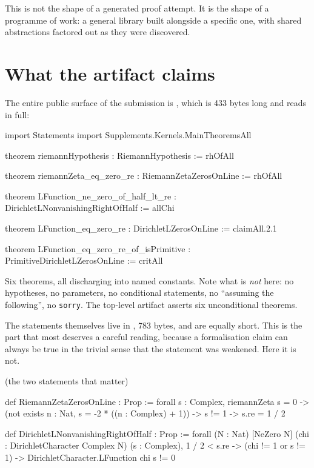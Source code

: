This is not the shape of a generated proof attempt. It is the shape of a
programme of work: a general library built alongside a specific one, with
shared abstractions factored out as they were discovered.

\section{What the artifact claims}The entire public surface of the submission is , which
is 433 bytes long and reads in full:

\begin{seamnote}{}
\begin{leanquote}
import Statements
import Supplements.Kernels.MainTheoremsAll

theorem riemannHypothesis : RiemannHypothesis := rhOfAll

theorem riemannZeta_eq_zero_re : RiemannZetaZerosOnLine := rhOfAll

theorem LFunction_ne_zero_of_half_lt_re :
    DirichletLNonvanishingRightOfHalf := allChi

theorem LFunction_eq_zero_re : DirichletLZerosOnLine := claimAll.2.1

theorem LFunction_eq_zero_re_of_isPrimitive :
    PrimitiveDirichletLZerosOnLine := critAll
\end{leanquote}
\end{seamnote}

Six theorems, all discharging into named constants. Note what is \emph{not}
here: no hypotheses, no parameters, no conditional statements, no ``assuming
the following'', no \texttt{sorry}. The top-level artifact asserts six
unconditional theorems.

The statements themselves live in , 783 bytes, and
are equally short. This is the part that most deserves a careful reading,
because a formalisation claim can always be true in the trivial sense that the
statement was weakened. Here it is not.

\begin{seamnote}{ (the two statements that matter)}
\begin{leanquote}
def RiemannZetaZerosOnLine : Prop :=
  forall s : Complex, riemannZeta s = 0 ->
    (not exists n : Nat, s = -2 * ((n : Complex) + 1)) ->
    s != 1 -> s.re = 1 / 2

def DirichletLNonvanishingRightOfHalf : Prop :=
  forall (N : Nat) [NeZero N] (chi : DirichletCharacter Complex N) (s : Complex),
    1 / 2 < s.re -> (chi != 1 or s != 1) ->
    DirichletCharacter.LFunction chi s != 0
\end{leanquote}
\end{seamnote}

